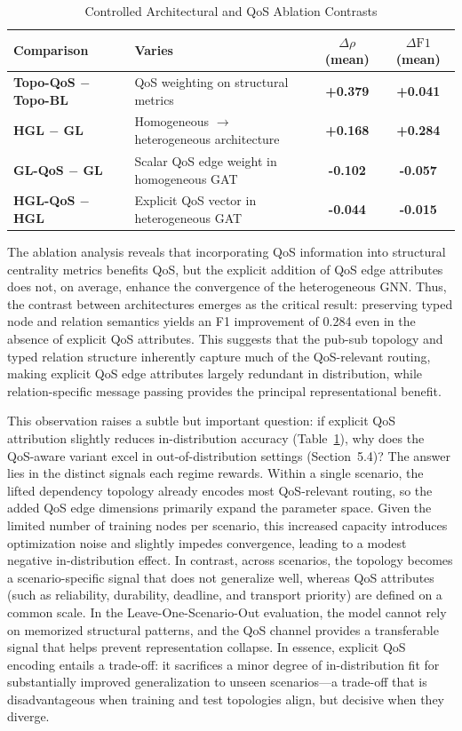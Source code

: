\documentclass[sigconf,9pt,anonymous]{acmart}
\begin{document}
\begin{table}[t]
\centering
\caption{Controlled Architectural and QoS Ablation Contrasts}
\label{tab:factorial_contrasts}
\begin{tabular}{l l c c}
\toprule
\textbf{Comparison} & \textbf{Varies} & \textbf{$\Delta\rho$ (mean)} & \textbf{$\Delta\text{F1}$ (mean)} \\
\midrule
\textbf{Topo-QoS $-$ Topo-BL} & QoS weighting on structural metrics & \textbf{+0.379} & \textbf{+0.041} \\
\textbf{HGL $-$ GL} & Homogeneous $\to$ heterogeneous architecture & \textbf{+0.168} & \textbf{+0.284} \\
\textbf{GL-QoS $-$ GL} & Scalar QoS edge weight in homogeneous GAT & \textbf{-0.102} & \textbf{-0.057} \\
\textbf{HGL-QoS $-$ HGL} & Explicit QoS vector in heterogeneous GAT & \textbf{-0.044} & \textbf{-0.015} \\
\bottomrule
\end{tabular}
\end{table}

The ablation analysis reveals that incorporating QoS information into structural centrality metrics benefits QoS, but the explicit addition of QoS edge attributes does not, on average, enhance the convergence of the heterogeneous GNN. Thus, the contrast between architectures emerges as the critical result: preserving typed node and relation semantics yields an F1 improvement of 0.284 even in the absence of explicit QoS attributes. This suggests that the pub-sub topology and typed relation structure inherently capture much of the QoS-relevant routing, making explicit QoS edge attributes largely redundant in distribution, while relation-specific message passing provides the principal representational benefit.

This observation raises a subtle but important question: if explicit QoS attribution slightly reduces in-distribution accuracy (Table~\ref{tab:factorial_contrasts}), why does the QoS-aware variant excel in out-of-distribution settings (Section~5.4)? The answer lies in the distinct signals each regime rewards. Within a single scenario, the lifted dependency topology already encodes most QoS-relevant routing, so the added QoS edge dimensions primarily expand the parameter space. Given the limited number of training nodes per scenario, this increased capacity introduces optimization noise and slightly impedes convergence, leading to a modest negative in-distribution effect. In contrast, across scenarios, the topology becomes a scenario-specific signal that does not generalize well, whereas QoS attributes (such as reliability, durability, deadline, and transport priority) are defined on a common scale. In the Leave-One-Scenario-Out evaluation, the model cannot rely on memorized structural patterns, and the QoS channel provides a transferable signal that helps prevent representation collapse. In essence, explicit QoS encoding entails a trade-off: it sacrifices a minor degree of in-distribution fit for substantially improved generalization to unseen scenarios—a trade-off that is disadvantageous when training and test topologies align, but decisive when they diverge.
\end{document}
